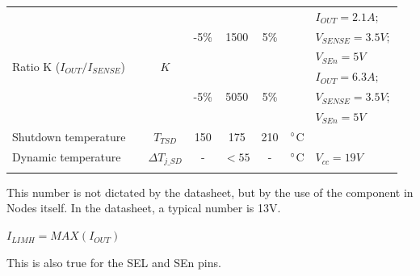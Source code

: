 \documentclass[10pt]{datasheet}
\begin{document}
\begin{table}[H]
\begin{threeparttable}
\begin{tabularx}{\textwidth}{l c | c| c c c | c | X}
    \hline
    \multicolumn{1}{l|}{\multirow{6}{*}{Ratio K ($I_{OUT}/I_{SENSE}$)}} & \multirow{3}{*}{\cite{ref11}} & \multirow{6}{*}{$K$} & \multirow{3}{*}{-5\%} & \multirow{3}{*}{1500} & \multirow{3}{*}{5\%} & & $I_{OUT}= 2.1A;$\\
    \multicolumn{1}{l|}{} & & & & & & &$V_{SENSE} = 3.5V;$\\
    \multicolumn{1}{l|}{} & & & & & & &$V_{SEn} = 5V$\\
    \cline{2-2}
    \cline{4-6}
    \cline{8-8}
    \multicolumn{1}{l|}{} & \multirow{3}{*}{\cite{ref16}} & & \multirow{3}{*}{-5\%} & \multirow{3}{*}{5050} & \multirow{3}{*}{5\%} & & $I_{OUT}= 6.3A;$\\
    \multicolumn{1}{l|}{} & & & & & & &$V_{SENSE} = 3.5V;$\\
    \multicolumn{1}{l|}{} & & & & & & &$V_{SEn} = 5V$\\
    \hline
    Shutdown temperature & & $T_{TSD}$ & 150 & 175 & 210 & $\degree$C & \\
    \hline
    Dynamic temperature & & $\Delta T_{j\_SD}$ & - & $<55$ & - & $\degree$C & $V_{cc} = 19V$\\
    \hline
    \thickhline
\end{tabularx}
\begin{tablenotes}
\item[1] {This number is not dictated by the datasheet, but by the use of the component in Nodes itself. In the datasheet, a typical number is 13V.}
\item[2] {$I_{LIMH}=MAX(I_{OUT})$}
\item[3] {This is also true for the SEL and SEn pins.}
\end{tablenotes}
\end{threeparttable}
\end{table}
\newpage
\end{document}
